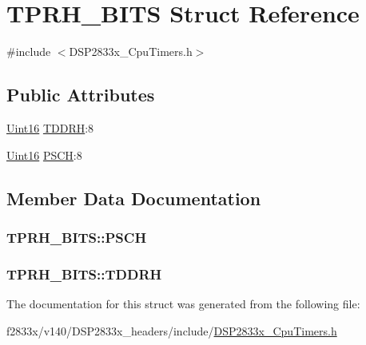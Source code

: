 \hypertarget{struct_t_p_r_h___b_i_t_s}{}\section{T\+P\+R\+H\+\_\+\+B\+I\+T\+S Struct Reference}
\label{struct_t_p_r_h___b_i_t_s}


{\ttfamily \#include $<$D\+S\+P2833x\+\_\+\+Cpu\+Timers.\+h$>$}

\subsection*{Public Attributes}
\begin{DoxyCompactItemize}
\item 
\hyperlink{_d_s_p2833x___device_8h_a59a9f6be4562c327cbfb4f7e8e18f08b}{Uint16} \hyperlink{struct_t_p_r_h___b_i_t_s_ac476c46bd706b797171aedce8363e949}{T\+D\+D\+R\+H}\+:8
\item 
\hyperlink{_d_s_p2833x___device_8h_a59a9f6be4562c327cbfb4f7e8e18f08b}{Uint16} \hyperlink{struct_t_p_r_h___b_i_t_s_a5c6ed900026b70f39cd2a7091cd68d29}{P\+S\+C\+H}\+:8
\end{DoxyCompactItemize}


\subsection{Member Data Documentation}
\hypertarget{struct_t_p_r_h___b_i_t_s_a5c6ed900026b70f39cd2a7091cd68d29}{}
\subsubsection[{P\+S\+C\+H}]{ T\+P\+R\+H\+\_\+\+B\+I\+T\+S\+::\+P\+S\+C\+H}\label{struct_t_p_r_h___b_i_t_s_a5c6ed900026b70f39cd2a7091cd68d29}
\hypertarget{struct_t_p_r_h___b_i_t_s_ac476c46bd706b797171aedce8363e949}{}
\subsubsection[{T\+D\+D\+R\+H}]{ T\+P\+R\+H\+\_\+\+B\+I\+T\+S\+::\+T\+D\+D\+R\+H}\label{struct_t_p_r_h___b_i_t_s_ac476c46bd706b797171aedce8363e949}


The documentation for this struct was generated from the following file\+:\begin{DoxyCompactItemize}
\item 
f2833x/v140/\+D\+S\+P2833x\+\_\+headers/include/\hyperlink{_d_s_p2833x___cpu_timers_8h}{D\+S\+P2833x\+\_\+\+Cpu\+Timers.\+h}\end{DoxyCompactItemize}
